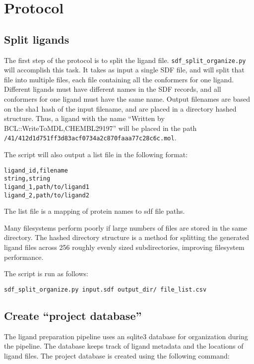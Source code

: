 \section{Protocol}

\subsection{Split ligands}

The first step of the protocol is to split the ligand file.
\texttt{sdf\_split\_organize.py} will accomplish this task. 
It takes as input a single \ac{SDF} file, and will split that file into multiple files, each file containing all the conformers for one ligand.
Different ligands must have different names in the \ac{SDF} records, and all conformers for one ligand must have the same name. 
Output filenames are based on the sha1 hash of the input filename, and are placed in a directory hashed structure.
Thus, a ligand with the name ``Written by BCL::WriteToMDL,CHEMBL29197''
will be placed in the path\\
\texttt{/41/412d1d751ff3d83acf0734a2c870faaa77c28c6c.mol}.

The script will also output a list file in the following format:

\begin{verbatim}
ligand_id,filename
string,string
ligand_1,path/to/ligand1
ligand_2,path/to/ligand2
\end{verbatim}

The list file is a mapping of protein names to sdf file paths.

Many filesystems perform poorly if large numbers of files are stored in the same directory. 
The hashed directory structure is a method for splitting the generated ligand files across 256 roughly evenly sized subdirectories, improving filesystem performance.

The script is run as follows:

\begin{verbatim}
sdf_split_organize.py input.sdf output_dir/ file_list.csv
\end{verbatim}

\subsection{Create ``project database''}

The ligand preparation pipeline uses an sqlite3 database for organization during the pipeline.
The database keeps track of ligand metadata and the locations of ligand files.
The project database is created using the following command:


